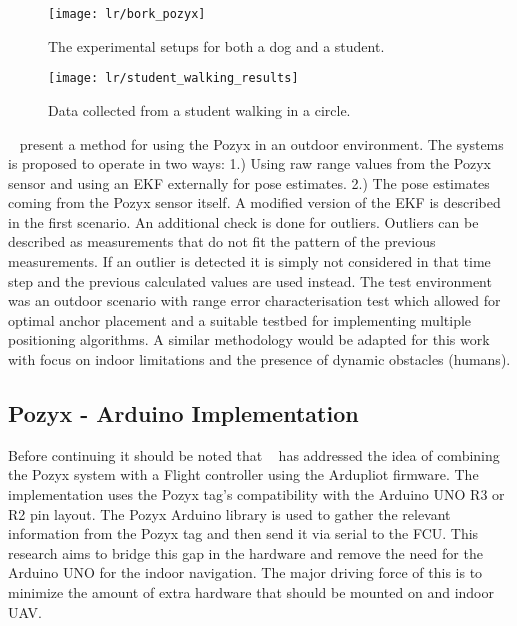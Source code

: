 \begin{figure}[h!]
    \centering
    \texttt{[image: lr/bork\_pozyx]}
    \caption{The experimental setups for both a dog and a student.}
    \label{fig:bpozyx}
\end{figure}

\begin{figure}[h!]
    \centering
    \texttt{[image: lr/student\_walking\_results]}
    \caption{Data collected from a student walking in a circle.}
    \label{fig:stupozyx}
\end{figure}

~\citet{conceiccao2017robot} present a method for using the Pozyx in an outdoor environment.
The systems is proposed to operate in two ways: 1.) Using raw range values from the Pozyx sensor and using an EKF externally for pose estimates. 2.) The pose estimates coming from the Pozyx sensor itself.
A modified version of the EKF is described in the first scenario.
An additional check is done for outliers.
Outliers can be described as measurements that do not fit the pattern of the previous measurements.
If an outlier is detected it is simply not considered in that time step and the previous calculated values are used instead.
The test environment was an outdoor scenario with range error characterisation test which allowed for optimal anchor placement and a suitable testbed for implementing multiple positioning algorithms.
A similar methodology would be adapted for this work with focus on indoor limitations and the presence of dynamic obstacles (humans).



\subsection{Pozyx - Arduino Implementation}
Before continuing it should be noted that ~\citet{ardupilotarduino} has addressed the idea of combining the Pozyx system with a Flight controller using the Ardupliot firmware.
The implementation uses the Pozyx tag's compatibility with the Arduino UNO R3 or R2 pin layout.
The Pozyx Arduino library is used to gather the relevant information from the Pozyx tag and then send it via serial to the FCU.
This research aims to bridge this gap in the hardware and remove the need for the Arduino UNO for the indoor navigation.
The major driving force of this is to minimize the amount of extra hardware that should be mounted on and indoor UAV.

